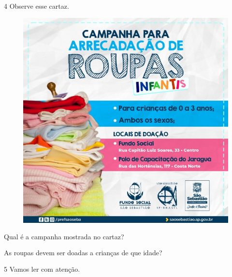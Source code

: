 \num{4} Observe esse cartaz.


\begin{figure}[htpb!]
\centering
\includegraphics[width=.5\textwidth]{media/image83.jpeg}
\end{figure}

\begin{escolha}
\item Qual é a campanha mostrada no cartaz?


\item As roupas devem ser doadas a crianças de que idade?

\end{escolha}

\num{5} Vamos ler com atenção.


